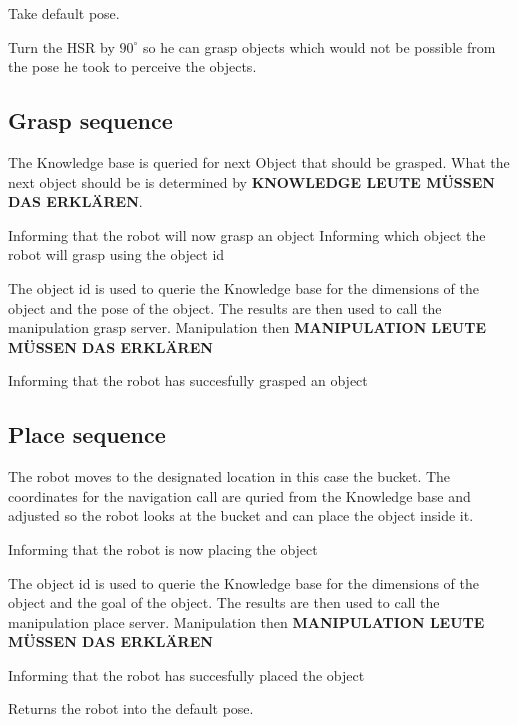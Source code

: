 \documentclass[main.tex]{subfiles}
\begin{document}
	Take default pose.
	
		
	Turn the HSR by $90^\circ$ so he can grasp objects which would not be possible from the pose he took to perceive the objects.
	
	\subsection{Grasp sequence}
	
    The Knowledge base is queried for next Object that should be grasped.
	What the next object should be is determined by \textbf{KNOWLEDGE LEUTE MÜSSEN DAS ERKLÄREN}.	
	
	Informing that the robot will now grasp an object
	Informing which object the robot will grasp using the object id
	
	The object id is used to querie the Knowledge base for the dimensions of the object and the pose of the object. The results are then used to call the manipulation grasp server. Manipulation then \textbf{MANIPULATION LEUTE MÜSSEN DAS ERKLÄREN}
	 
	Informing that the robot has succesfully grasped an object
	
	\subsection{Place sequence}
	The robot moves to the designated location in this case the bucket.
	The coordinates for the navigation call are quried from the Knowledge base and adjusted so the robot looks at the bucket and can place the object inside it. 
	
	Informing that the robot is now placing the object

	The object id is used to querie the Knowledge base for the dimensions of the object and the goal of the object. The results are then used to call the manipulation place server. Manipulation then \textbf{MANIPULATION LEUTE MÜSSEN DAS ERKLÄREN}
	 
	Informing that the robot has succesfully placed the object

	Returns the robot into the default pose.
	
\end{document}
